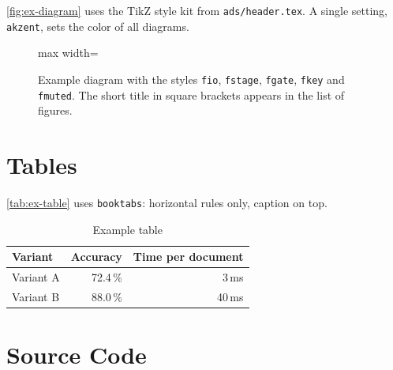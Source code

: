 \autoref{fig:ex-diagram} uses the TikZ style kit from \texttt{ads/header.tex}.
A single setting, \texttt{akzent}, sets the color of all diagrams.

\begin{figure}[htbp]
  \centering
  \begin{adjustbox}{max width=\textwidth}
  \end{adjustbox}
  \caption[Example diagram]{Example diagram with the styles \texttt{fio}, \texttt{fstage}, \texttt{fgate}, \texttt{fkey} and \texttt{fmuted}. The short title in square brackets appears in the list of figures.}
  \label{fig:ex-diagram}
\end{figure}

\section{Tables}\label{sec:ex-tables}

\autoref{tab:ex-table} uses \texttt{booktabs}: horizontal rules only, caption on top.

\begin{table}[htbp]
  \centering
  \caption{Example table}
  \label{tab:ex-table}
  \begin{tabular}{lrr}
    \toprule
    Variant & Accuracy & Time per document \\
    \midrule
    Variant A & 72.4\,\% & 3\,ms \\
    Variant B & 88.0\,\% & 40\,ms \\
    \bottomrule
  \end{tabular}
\end{table}

\section{Source Code}\label{sec:ex-code}

